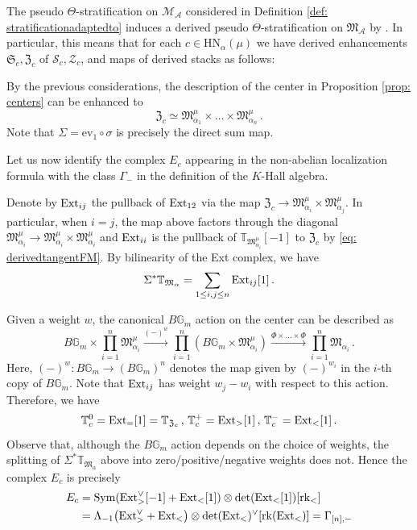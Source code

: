 \documentclass[12pt]{amsart}
\theoremstyle{definition}
\newcommand{\BG}{{\mathbb{G}}}
\newcommand{\BT}{{\mathbb{T}}}
\newcommand{\CA}{{\mathcal A}}
\newcommand{\CM}{{\mathcal M}}
\newcommand{\CS}{{\mathcal S}}
\newcommand{\CZ}{{\mathcal Z}}
\newcommand{\1}{\mathbf 1}
\newcommand{\FM}{{\mathfrak{M}}}
\newcommand{\FZ}{{\mathfrak{Z}}}
\newcommand{\FS}{{\mathfrak{S}}}
\DeclareMathOperator{\Sym}{Sym}
\newcommand{\Ext}{\mathcal{E}\text{xt}}
\newcommand{\rk}{\mathrm{rk}}
\newcommand{\gr}{\mathrm{gr}}
\renewcommand{\ev}{\mathrm{ev}}
\newcommand{\HN}{\mathrm{HN}}
\renewcommand{\Ext}{\textup{Ext}}
\begin{document}
The pseudo $\Theta$-stratification on $\CM_\CA$ considered in Definition \ref{def: stratificationadaptedto} induces a derived pseudo $\Theta$-stratification on $\FM_\CA$ by \cite[Lemma 1.2.3]{HLderived}. In particular, this means that for each $c\in \HN_\alpha(\mu)$ we have derived enhancements $\FS_c, \FZ_c$ of $\CS_c, \CZ_c$, and maps of derived stacks as follows:
\begin{center}
\end{center}
By the previous considerations, the description of the center in Proposition \ref{prop: centers} can be enhanced to
\[\FZ_{c}\simeq \FM_{\alpha_1}^\mu\times \ldots \times \FM_{\alpha_n}^\mu\,.\]
Note that $\Sigma=\ev_1\circ \sigma$ is precisely the direct sum map.

Let us now identify the complex $E_c$ appearing in the non-abelian localization formula with the class $\Gamma_-$ in the definition of the $K$-Hall algebra. 

Denote by $\Ext_{ij}$ the pullback of $\Ext_{12}$ via the map $\FZ_c\to \FM_{\alpha_i}^\mu\times \FM_{\alpha_j}^\mu$. In particular, when $i=j$, the map above factors through the diagonal $\FM_{\alpha_i}^\mu\to \FM_{\alpha_i}^\mu\times \FM_{\alpha_i}^\mu$ and $\Ext_{ii}$ is the pullback of $\BT_{\FM_{\alpha_i}^\mu}[-1]$ to $\FZ_c$ by \eqref{eq: derivedtangentFM}. By bilinearity of the Ext complex, we have
\[\Sigma^\ast \BT_{\FM_\alpha}=\sum_{1\leq i,j\leq n}\Ext_{ij}[1]\,.\]

Given a weight $w$, the canonical $B\BG_m$ action on the center can be described as
\[B\BG_m\times \prod_{i=1}^n \FM_{\alpha_i}^\mu\xrightarrow{(-)^w}
\prod_{i=1}^n (B\BG_m\times\FM_{\alpha_i}^\mu)\xrightarrow{\Phi\times \ldots\times \Phi} \prod_{i=1}^n \FM_{\alpha_i}\,.\]
Here, $(-)^w\colon B\BG_m\to (B\BG_m)^n$ denotes the map given by $(-)^{w_i}$ in the $i$-th copy of $B\BG_m$. Note that $\Ext_{ij}$ has weight $w_j-w_i$ with respect to this action. Therefore, we have 
\[\BT_c^0=\Ext_=[1]=\BT_{\FZ_c}\,,\,\BT_{c}^{+}=\Ext_{>}[1]\,,\, \BT_{c}^{-}=\Ext_{<}[1]\,.\]
Observe that, although the $B\BG_m$ action depends on the choice of weights, the splitting of $\Sigma^\ast \BT_{\FM_\alpha}$ above into zero/positive/negative weights does not. Hence the complex $E_c$ is precisely
\begin{align}
    E_c&=\Sym(\Ext_{>}^\vee[-1]+\Ext_<[1])\otimes \det(\Ext_{<}[1])[\rk_<]\\
    &=\Lambda_{-1}\big(\Ext_>^\vee+\Ext_<\big)\otimes \det(\Ext_<)^\vee[\rk(\Ext_<)]=\Gamma_{[n],-} \nonumber
\end{align}
\end{document}
